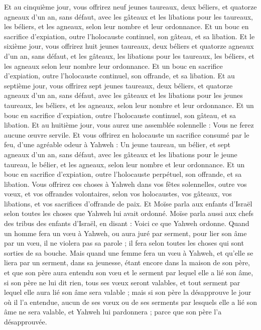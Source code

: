 \begin{multicols}{2}
Et au cinquième jour, vous offrirez neuf jeunes taureaux, deux béliers, et quatorze agneaux d'un an, sans défaut,
avec les gâteaux et les libations pour les taureaux, les béliers, et les agneaux, selon leur nombre et leur ordonnance.
Et un bouc en sacrifice d'expiation, outre l'holocauste continuel, son gâteau, et sa libation.
Et le sixième jour, vous offrirez huit jeunes taureaux, deux béliers et quatorze agneaux d'un an, sans défaut,
et les gâteaux, les libations pour les taureaux, les béliers, et les agneaux selon leur nombre leur ordonnance.
Et un bouc en sacrifice d'expiation, outre l'holocauste continuel, son offrande, et sa libation.
Et au septième jour, vous offrirez sept jeunes taureaux, deux béliers, et quatorze agneaux d'un an, sans défaut,
avec les gâteaux et les libations pour les jeunes taureaux, les béliers, et les agneaux, selon leur nombre et leur ordonnance.
Et un bouc en sacrifice d'expiation, outre l'holocauste continuel, son gâteau, et sa libation.
Et au huitième jour, vous aurez une assemblée solennelle : Vous ne ferez aucune œuvre servile.
Et vous offrirez en holocauste un sacrifice consumé par le feu, d'une agréable odeur à Yahweh : Un jeune taureau, un bélier, et sept agneaux d'un an, sans défaut,
avec les gâteaux et les libations pour le jeune taureau, le bélier, et les agneaux, selon leur nombre et leur ordonnance.
Et un bouc en sacrifice d'expiation, outre l'holocauste perpétuel, son offrande, et sa libation.
Vous offrirez ces choses à Yahweh dans vos fêtes solennelles, outre vos vœux, et vos offrandes volontaires, selon vos holocaustes, vos gâteaux, vos libations, et vos sacrifices d'offrande de paix.
\VerseOne{}Et Moïse parla aux enfants d'Israël selon toutes les choses que Yahweh lui avait ordonné.
Moïse parla aussi aux chefs des tribus des enfants d'Israël, en disant : Voici ce que Yahweh ordonne.
Quand un homme fera un vœu à Yahweh, ou aura juré par serment, pour lier son âme par un vœu, il ne violera pas sa parole ; il fera selon toutes les choses qui sont sorties de sa bouche.
Mais quand une femme fera un vœu à Yahweh, et qu'elle se liera par un serment, dans sa jeunesse, étant encore dans la maison de son père,
et que son père aura entendu son vœu et le serment par lequel elle a lié son âme, si son père ne lui dit rien, tous ses vœux seront valables, et tout serment par lequel elle aura lié son âme sera valable ;
mais si son père la désapprouve le jour où il l'a entendue, aucun de ses vœux ou de ses serments par lesquels elle a lié son âme ne sera valable, et Yahweh lui pardonnera ; parce que son père l'a désapprouvée.

\end{multicols}
